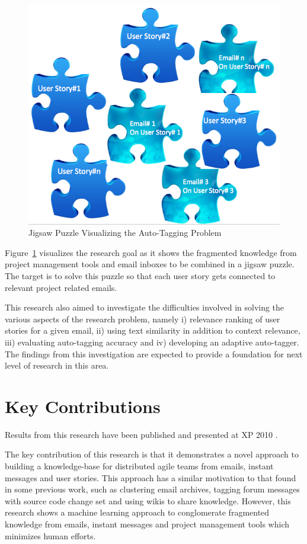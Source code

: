 \begin{figure}[h!]
	\centering
	\includegraphics[width=\textwidth]{Jigsaw.png}
    \caption{Jigsaw Puzzle Visualizing the Auto-Tagging Problem}
	\label{fig:jigsaw}
\end{figure}


Figure~\ref{fig:jigsaw} visualizes the research goal as it shows the fragmented knowledge from project management tools and email inboxes to be combined in a jigsaw puzzle. The target is to solve this puzzle so that each user story gets connected to relevant project related emails.

This research also aimed to investigate the difficulties involved in solving the various aspects of the research problem, namely i) relevance ranking of user stories for a given email, ii) using text similarity in addition to context relevance, iii) evaluating auto-tagging accuracy and iv) developing an adaptive auto-tagger. The findings from this investigation are expected to provide a foundation for next level of research in this area.

\section{Key Contributions}
Results from this research have been published and presented at XP 2010 \cite{auto_tagging}. 

The key contribution of this research is that it demonstrates a novel approach to building a knowledge-base for distributed agile teams from emails, instant messages and user stories. This approach has a similar motivation to that found in some previous work, such as clustering email archives\cite{using_hybrid}, tagging forum messages with source code change set\cite{hipikat, hipikat_2} and using wikis to share knowledge. However, this research shows a machine learning approach to conglomerate fragmented knowledge from emails, instant messages and project management tools which minimizes human efforts.
                                  
